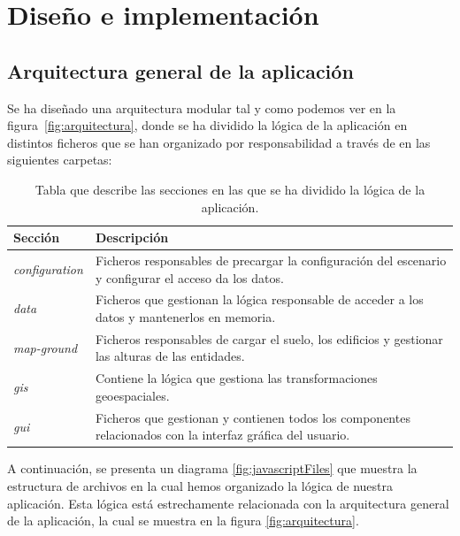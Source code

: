\documentclass[a4paper, 11pt]{book}
\begin{document}

\clearpage


\chapter{Diseño e implementación}
\label{sec:diseno}
\section{Arquitectura general de la aplicación} 
\label{sec:arquitectura}
Se ha diseñado una arquitectura modular tal y como podemos ver en la figura~\ref{fig:arquitectura}, donde se ha dividido la lógica de la aplicación en distintos ficheros que se han organizado por responsabilidad a través de en las siguientes carpetas:
\begin{table}[h]
	\begin{center}
		\begin{tabular}{|l|p{13cm}|}
			\hline
			\textbf{Sección} & \textbf{Descripción} \\
			\hline
			\emph{configuration} & Ficheros responsables de precargar la configuración del escenario y configurar el acceso da los datos. \\\hline
			\emph{data} & Ficheros que gestionan la lógica responsable de acceder a los datos y mantenerlos en memoria. \\\hline
			\emph{map-ground} & Ficheros responsables de cargar el suelo, los edificios y gestionar las alturas de las entidades. \\\hline
			\emph{gis} & Contiene la lógica que gestiona las transformaciones geoespaciales. \\\hline
			\emph{gui} & Ficheros que gestionan y contienen todos los componentes relacionados con la interfaz gráfica del usuario.\\\hline
		\end{tabular}
		\caption{Tabla que describe las secciones en las que se ha dividido la lógica de la aplicación.}
	\end{center}
\end{table}
A continuación, se presenta un diagrama \ref{fig:javascriptFiles} que muestra la estructura de archivos en la cual hemos organizado la lógica de nuestra aplicación. 
Esta lógica está estrechamente relacionada con la arquitectura general de la aplicación, la cual se muestra en la figura \ref{fig:arquitectura}. 
\end{document}
